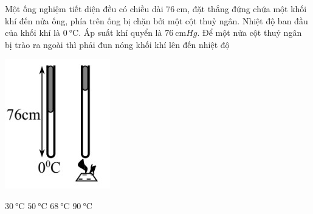 \begin{ex}
	Một ống nghiệm tiết diện đều có chiều dài $\SI{76}{\centi\meter}$, đặt thẳng đứng chứa một khối khí đến nửa ống, phía trên ống bị chặn bởi một cột thuỷ ngân. Nhiệt độ ban đầu của khối khí là $\SI{0}{\celsius}$. Áp suất khí quyển là $\SI{76}{\centi\meter Hg}$. Để một nửa cột thuỷ ngân bị trào ra ngoài thì phải đun nóng khối khí lên đến nhiệt độ
	\begin{center}
		\includegraphics[width=0.15\linewidth]{figs/VN12-Y24-PH-SYL-012P-5}
	\end{center}
	
	\choice
	{$\SI{30}{\celsius}$}
	{$\SI{50}{\celsius}$}
	{\True $\SI{68}{\celsius}$}
	{$\SI{90}{\celsius}$}
\end{ex}
